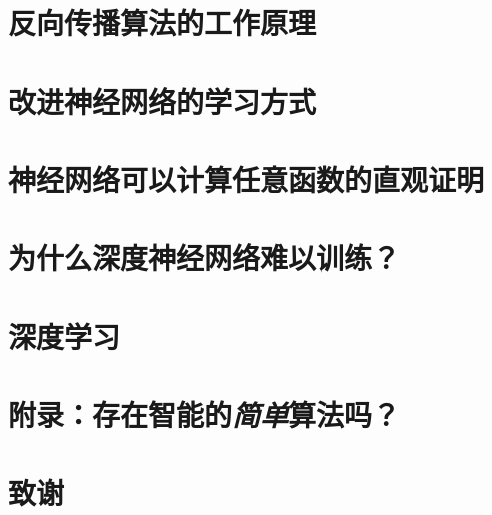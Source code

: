 \documentclass[a4paper,11pt,oneside,openany,fontset=none]{ctexbook}
\begin{document}
\chapter{反向传播算法的工作原理}

\chapter{改进神经网络的学习方式}

\chapter{神经网络可以计算任意函数的直观证明}

\chapter{为什么深度神经网络难以训练？}

\chapter{深度学习}

\chapter*{附录：存在智能的\emph{简单}算法吗？}
{}




\chapter*{致谢}
{}

\end{document}
